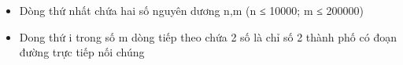 \begin{itemize}
	\item Dòng thứ nhất chứa hai số nguyên dương n,m (n ≤ 10000; m ≤ 200000)
	\item Dong thứ i trong số m dòng tiếp theo chứa 2 số là chỉ số 2 thành phố có đoạn đường trực tiếp nối chúng
\end{itemize}

\